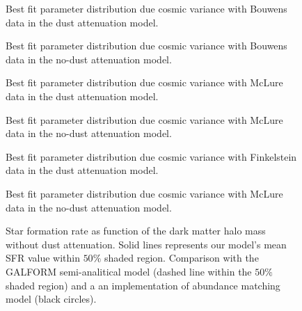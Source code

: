 \documentclass{emulateapj}
\begin{document}
\begin{figure}
\caption{Best fit parameter distribution due cosmic variance with Bouwens data in the dust
 attenuation model.}
\label{fig:OD2_CosmicVar1_w_dust}
\end{figure}

\begin{figure}
\caption{Best fit parameter distribution due cosmic variance with Bouwens data in the no-dust
 attenuation model.}
\label{fig:OD2_CosmicVar1_wo_dust}
\end{figure}


\begin{figure}
\caption{Best fit parameter distribution due cosmic variance with McLure data in the dust
 attenuation model.}
\label{fig:OD3_CosmicVar1_w_dust}
\end{figure}


\begin{figure}
\caption{Best fit parameter distribution due cosmic variance with McLure data in the no-dust
 attenuation model.}
\label{fig:OD3_CosmicVar1_wo_dust}
\end{figure}




\begin{figure}
\caption{Best fit parameter distribution due cosmic variance with Finkelstein data in the dust
 attenuation model.}
\label{fig:OD4_CosmicVar1_w_dust}
\end{figure}

\begin{figure}
\caption{Best fit parameter distribution due cosmic variance with McLure data in the no-dust
 attenuation model.}
\label{fig:OD3_CosmicVar1_wo_dust}
\end{figure}





\begin{figure}
\caption{Star formation rate as function of the dark matter halo mass without dust attenuation. 
Solid lines represents our model's mean SFR value within $50\%$  shaded region. 
Comparison with the GALFORM semi-analitical model \citep{Gonzalez14} (dashed line within the 
$50\%$ shaded region) and a an implementation of abundance matching model \citep{Behroozi13}
(black circles). }
\label{fig:SFR_DMHM_wo}
\end{figure}
\end{document}
